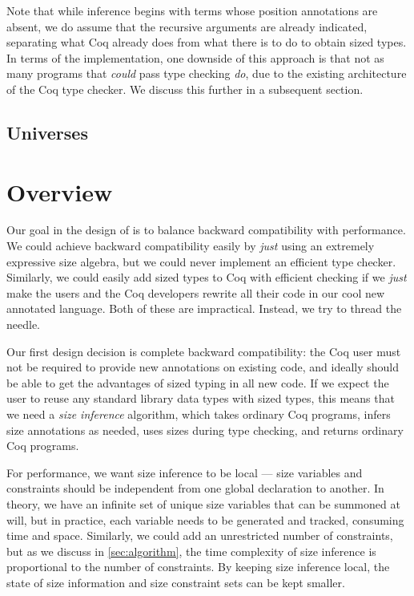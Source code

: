 Note that while inference begins with terms whose position annotations are absent,
we do assume that the recursive arguments are already indicated,
separating what Coq already does from what there is to do to obtain sized types.
In terms of the implementation, one downside of this approach is that not as many programs that \emph{could} pass type checking \emph{do},
due to the existing architecture of the Coq type checker.
We discuss this further in a subsequent section.

\subsection{Universes}



\section{Overview}\label{sec:sponge-cake}
Our goal in the design of \lang is to balance backward compatibility with performance.
We could achieve backward compatibility easily by \emph{just} using an extremely expressive size algebra, but we could never implement an efficient type checker.
Similarly, we could easily add sized types to Coq with efficient checking if we \emph{just} make the users and the Coq developers rewrite all their code in our cool new annotated language.
Both of these are impractical.
Instead, we try to thread the needle.

Our first design decision is complete backward compatibility: the Coq user must not be required to provide new annotations on existing code, and ideally should be able to get the advantages of sized typing in all new code.
If we expect the user to reuse any standard library data types with sized types, this means that we need a \emph{size inference} algorithm, which takes ordinary Coq programs, infers size annotations as needed, uses sizes during type checking, and returns ordinary Coq programs.

For performance, we want size inference to be local --- size variables and constraints should be independent from one global declaration to another.
In theory, we have an infinite set of unique size variables that can be summoned at will, but in practice, each variable needs to be generated and tracked, consuming time and space.
Similarly, we could add an unrestricted number of constraints, but as we discuss in \autoref{sec:algorithm}, the time complexity of size inference is proportional to the number of constraints.
By keeping size inference local, the state of size information and size constraint sets can be kept smaller.

